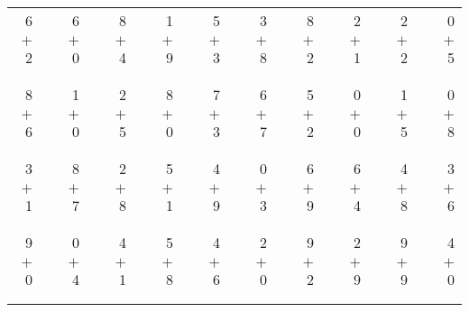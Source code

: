 \documentclass[12pt, letterpaper]{article}
\begin{document}
\begin{tabular}{rrrrrrrrrrrrrrrrrrr}
6 & & 6 & & 8 & & 1 & & 5 & & 3 & & 8 & & 2 & & 2 & & 0\\
$+$ 2 & & $+$ 0 & & $+$ 4 & & $+$ 9 & & $+$ 3 & & $+$ 8 & & $+$ 2 & & $+$ 1 & & $+$ 2 & & $+$ 5\\
\cline{1-1} \cline{3-3} \cline{5-5} \cline{7-7} \cline{9-9} \cline{11-11} \cline{13-13} \cline{15-15} \cline{17-17} \cline{19-19} \\ \\
8 & & 1 & & 2 & & 8 & & 7 & & 6 & & 5 & & 0 & & 1 & & 0\\
$+$ 6 & & $+$ 0 & & $+$ 5 & & $+$ 0 & & $+$ 3 & & $+$ 7 & & $+$ 2 & & $+$ 0 & & $+$ 5 & & $+$ 8\\
\cline{1-1} \cline{3-3} \cline{5-5} \cline{7-7} \cline{9-9} \cline{11-11} \cline{13-13} \cline{15-15} \cline{17-17} \cline{19-19} \\ \\
3 & & 8 & & 2 & & 5 & & 4 & & 0 & & 6 & & 6 & & 4 & & 3\\
$+$ 1 & & $+$ 7 & & $+$ 8 & & $+$ 1 & & $+$ 9 & & $+$ 3 & & $+$ 9 & & $+$ 4 & & $+$ 8 & & $+$ 6\\
\cline{1-1} \cline{3-3} \cline{5-5} \cline{7-7} \cline{9-9} \cline{11-11} \cline{13-13} \cline{15-15} \cline{17-17} \cline{19-19} \\ \\
9 & & 0 & & 4 & & 5 & & 4 & & 2 & & 9 & & 2 & & 9 & & 4\\
$+$ 0 & & $+$ 4 & & $+$ 1 & & $+$ 8 & & $+$ 6 & & $+$ 0 & & $+$ 2 & & $+$ 9 & & $+$ 9 & & $+$ 0\\
\cline{1-1} \cline{3-3} \cline{5-5} \cline{7-7} \cline{9-9} \cline{11-11} \cline{13-13} \cline{15-15} \cline{17-17} \cline{19-19} \\ \\
\end{tabular}
\newpage
\end{document}

